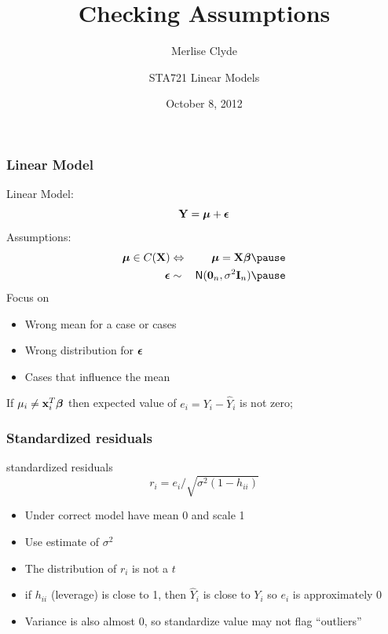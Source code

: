 \documentclass[]{beamer}
\title{Checking Assumptions}
\subtitle{Merlise Clyde}
\author{STA721 Linear Models}
\institute{Duke University}
\date{October 8, 2012}
\begin{document}
\maketitle

\begin{frame} \frametitle{ Linear Model}
Linear Model:
 $$ \mathbf{Y} = \boldsymbol{\mu} + \boldsymbol{\epsilon} $$ \pause
Assumptions: \pause
\begin{eqnarray*}
   \mub \in C(\X) & \Leftrightarrow & \mub = \X \b \pause \\
   \eps  & \sim &  \N(\zero_n, \sigma^2 \I_n) \pause
\end{eqnarray*}
Focus on 
\begin{itemize}
\item Wrong mean for a case or cases \pause \\
\item Wrong distribution for $\boldsymbol{\epsilon}$  \pause
\item Cases that influence the mean \pause
\end{itemize}
If $\mu_i \neq \mathbf{x}_i^T\boldsymbol{\beta}$ then expected value of $e_i = Y_i -\hat{Y}_i$
is not zero; 
\end{frame}

\begin{frame} \frametitle{Standardized residuals}
standardized residuals $$r_i = e_i/\sqrt{\sigma^2(1 - h_{ii})}$$

\begin{itemize}
\item Under correct model have mean 0 and scale 1 \pause
\item Use estimate of $\sigma^2$ \pause
\item The distribution of $r_i$ is not a $t$ \pause
\item if $h_{ii}$ (leverage) is close to 1, then $\hat{Y}_i$ is close to
  $Y_i$ so $e_i$ is approximately 0 \pause
\item Variance is also almost 0, so standardize value may not flag ``outliers''
\end{itemize}

\end{frame}
\end{document}
